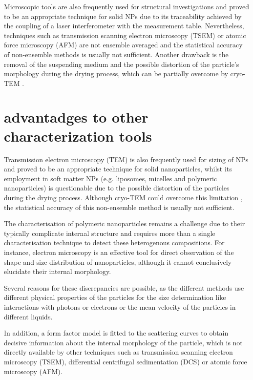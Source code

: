 Microscopic tools are also frequently used for structural investigations and proved to be an appropriate technique for solid NPs \citep{joensson_morphology_1991,silverstein_microstructure_1989} due to its traceability achieved by the coupling of a laser interferometer with the measurement table. Nevertheless, techniques such as transmission scanning electron microscopy (TSEM) or atomic force microscopy (AFM) are not ensemble averaged and the statistical accuracy of non-ensemble methods is usually not sufficient. Another drawback is the removal of the suspending medium and the possible distortion of the particle's morphology during the drying process, which can be partially overcome by cryo-TEM \citep{li_doxorubicin_1998}.

\section{advantadges to other characterization tools}


Transmission electron microscopy (TEM) is also frequently used for sizing of NPs and proved to be an appropriate technique for solid nanoparticles, whilst its employment in soft matter NPs (e.g. liposomes, micelles and polymeric nanoparticles) is questionable due to the possible distortion of the particles during the drying process.  Although cryo-TEM could overcome this limitation \citep{li_doxorubicin_1998}, the statistical accuracy of this non-ensemble method is usually not sufficient.

The characterisation of polymeric nanoparticles remains a challenge due to their typically complicate internal structure\citep{beyer_saxs_1990} and requires more than a single characterisation technique to detect these heterogenous compositions. For instance, electron microscopy is an effective tool for direct observation of the shape and size distribution of nanoparticles, although it cannot conclusively elucidate their internal morphology.




Several reasons for these discrepancies are possible, as the different methods use different physical properties of the particles for the size determination like interactions with photons or electrons or the mean velocity of the particles in different liquids.

In addition, a form factor model is fitted to the scattering curves to obtain decisive information about the internal morphology of the particle, which is not directly available by other techniques such as transmission scanning electron microscopy (TSEM), differential centrifugal sedimentation (DCS)\citep{fielding_correcting_2012} or atomic force microscopy (AFM).

